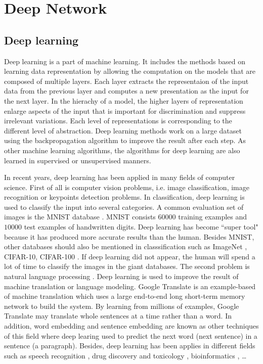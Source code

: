 \chapter{Deep Network}
\section{Deep learning}
Deep learning is a part of machine learning. It includes the methods based on learning data representation by allowing the computation on the models that are composed of multiple layers. Each layer extracts the representaion of the input data from the previous layer and computes a new presentation as the input for the next layer. In the hierachy of a model, the higher layers of representation enlarge aspects of the input that is important for discrimination and suppress irrelevant variations. Each level of representations is corresponding to the different level of abstraction. Deep learning methods work on a large dataset using the backpropagation algorithm to improve the result after each step. As other machine learning algorithms, the algorithms for deep learning are also learned in supervised or unsupervised manners.

In recent years, deep learning has been applied in many fields of computer science. First of all is computer vision problems, i.e. image classification, image recognition or keypoints detection problems. In classification, deep learning is used to classify the input into several categories. A common evaluation set of images is the MNIST database \cite{}. MNIST consists $60 000$ training examples and $10 000$ test examples of handwritten digits. Deep learning has become ``super tool" because it has produced more accurate results than the human. Besides MNIST, other databases should also be mentioned in classsification such as ImageNet \cite{}, CIFAR-10, CIFAR-100 \cite{}. If deep learning did not appear, the human will spend a lot of time to classify the images in the giant databases. The second problem is natural language processing \cite{}. Deep learning is used to improve the result of machine translation or language modeling. Google Translate \cite{} is an example-based of machine translation which uses a large end-to-end long short-term memory network to build the system. By learning from millions of examples, Google Translate may translate whole sentences at a time rather than a word. In addition, word embedding \cite{} and sentence embedding \cite{} are known as other techniques of this field where deep learing used to predict the next word (next sentence) in a sentence (a paragraph). Besides, deep learning has been applies in different fields such as speech recognition \cite{}, drug discovery and toxicology \cite{}, bioinformatics \cite{}, \ldots

